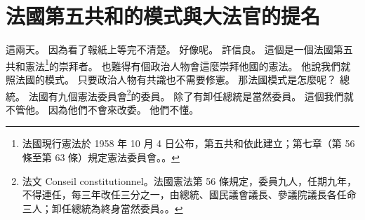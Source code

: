 \section{法國第五共和的模式與大法官的提名}

\hypertarget{w01:cue:1802}{}這兩天。
\hypertarget{w01:cue:1803}{}因為看了報紙上等完不清楚。
\hypertarget{w01:cue:1804}{}好像呢。
\hypertarget{w01:cue:1805}{}許信良。
\hypertarget{w01:cue:1806}{}這個是一個法國第五共和憲法\footnote{法國現行憲法於 1958 年 10 月 4 日公布，第五共和依此建立；第七章（第 56 條至第 63 條）規定憲法委員會。\cite{const1958}。}的崇拜者。
\hypertarget{w01:cue:1807}{}也難得有個政治人物會這麼崇拜他國的憲法。
\hypertarget{w01:cue:1808}{}他說我們就照法國的模式。
\hypertarget{w01:cue:1809}{}只要政治人物有共識也不需要修憲。
\hypertarget{w01:cue:1810}{}那法國模式是怎麼呢？
\hypertarget{w01:cue:1811}{}總統。
\hypertarget{w01:cue:1812}{}法國有九個憲法委員會\footnote{法文 Conseil constitutionnel。法國憲法第 56 條規定，委員九人，任期九年，不得連任，每三年改任三分之一，由總統、國民議會議長、參議院議長各任命三人；卸任總統為終身當然委員。\cite[第 56 條]{const1958}。}的委員。
\hypertarget{w01:cue:1813}{}除了有卸任總統是當然委員。
\hypertarget{w01:cue:1814}{}這個我們就不管他。
\hypertarget{w01:cue:1815}{}因為他們不會來改委。
\hypertarget{w01:cue:1816}{}他們不懂。

